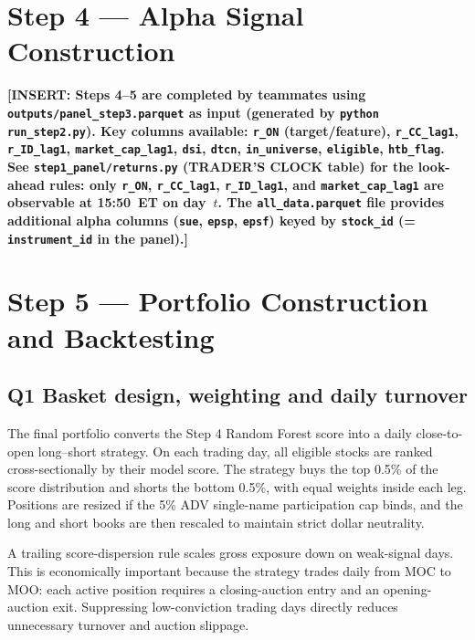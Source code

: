 \documentclass[12pt,a4paper]{article}
\newcommand{\ins}[1]{\textcolor{red!70!black}{\textbf{[INSERT: #1]}}}
\begin{document}
\section{Step 4 --- Alpha Signal Construction}

\ins{Steps 4--5 are completed by teammates using \texttt{outputs/panel\_step3.parquet}
as input (generated by \texttt{python run\_step2.py}).
Key columns available:
\texttt{r\_ON} (target/feature), \texttt{r\_CC\_lag1}, \texttt{r\_ID\_lag1},
\texttt{market\_cap\_lag1}, \texttt{dsi}, \texttt{dtcn},
\texttt{in\_universe}, \texttt{eligible}, \texttt{htb\_flag}.
See \texttt{step1\_panel/returns.py} (TRADER'S CLOCK table) for the
look-ahead rules: only \texttt{r\_ON}, \texttt{r\_CC\_lag1}, \texttt{r\_ID\_lag1},
and \texttt{market\_cap\_lag1} are observable at 15:50~ET on day~$t$.
The \texttt{all\_data.parquet} file provides additional alpha columns
(\texttt{sue}, \texttt{epsp}, \texttt{epsf}) keyed by \texttt{stock\_id}
(= \texttt{instrument\_id} in the panel).}
\section{Step 5 --- Portfolio Construction and Backtesting}


\subsection*{Q1 \quad Basket design, weighting and daily turnover}

The final portfolio converts the Step 4 Random Forest score into a daily
close-to-open long--short strategy. On each trading day, all eligible stocks are
ranked cross-sectionally by their model score. The strategy buys the top
0.5\% of the score distribution and shorts the bottom 0.5\%, with equal weights
inside each leg. Positions are resized if the 5\% ADV single-name participation
cap binds, and the long and short books are then rescaled to maintain strict
dollar neutrality.

A trailing score-dispersion rule scales gross exposure down on weak-signal days.
This is economically important because the strategy trades daily from MOC to MOO:
each active position requires a closing-auction entry and an opening-auction exit.
Suppressing low-conviction trading days directly reduces unnecessary turnover and
auction slippage.
\end{document}
